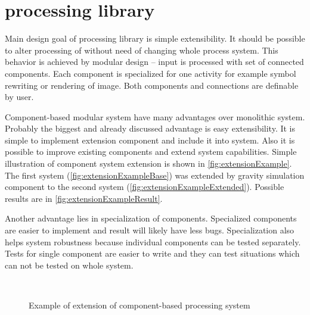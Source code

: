 
\section{\lsystem processing library}

Main design goal of \lsystem processing library is simple extensibility.
It should be possible to alter processing of \lsystem without need of changing whole process system.
This behavior is achieved by modular design -- input is processed with set of connected components.
Each component is specialized for one activity for example symbol rewriting or rendering of image.
Both components and connections are definable by user.

Component-based modular system have many advantages over monolithic system.
Probably the biggest and already discussed advantage is easy extensibility.
It is simple to implement extension component and include it into system.
Also it is possible to improve existing components and extend system capabilities.
Simple illustration of component system extension is shown in \autoref{fig:extensionExample}.
The first system (\ref{fig:extensionExampleBase}) was extended by gravity simulation component to the second system (\ref{fig:extensionExampleExtended}).
Possible results are in \autoref{fig:extensionExampleResult}.

Another advantage lies in specialization of components.
Specialized components are easier to implement and result will likely have less bugs.
Specialization also helps system robustness because individual components can be tested separately.
Tests for single component are easier to write and they can test situations which can not be tested on whole system.

\begin{figure}[h]
	\centering
	\\
	\caption{Example of extension of component-based \lsystem processing system}
	\label{fig:extensionExample}
\end{figure}

